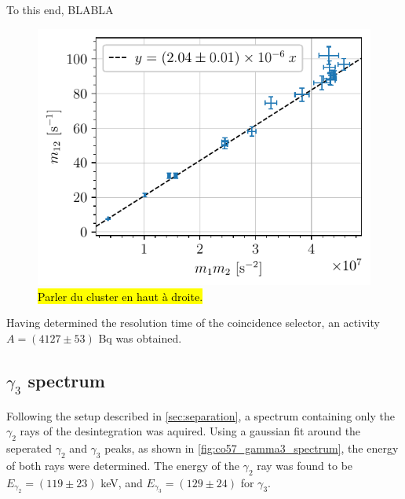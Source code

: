 To this end, BLABLA

\begin{figure}[htbp]
    \centering
    \includegraphics[scale=1]{figures/twotheta_cs137.pdf}
    \caption{\hl{Parler du cluster en haut à droite.}}
    \label{fig:twotheta_cs137}
\end{figure}


Having determined the resolution time of the coincidence selector, an activity $A= (4127 \pm 53)$ Bq was obtained.

\subsection{$\gamma_3$ spectrum}

Following the setup described in \autoref{sec:separation}, a spectrum containing only the \(\gamma_2\) rays of the \cobalt desintegration was aquired. Using a gaussian fit around the seperated \(\gamma_2\) and \(\gamma_3\) peaks, as shown in \autoref{fig:co57_gamma3_spectrum}, the energy of both rays were determined. The energy of the \(\gamma_2\) ray was found to be \(E_{\gamma_2} = (119 \pm 23)\) keV, and \(E_{\gamma_3} = (129 \pm 24)\) for \(\gamma_3\).

